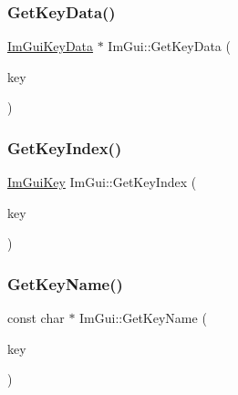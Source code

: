 \mbox{\label{namespaceImGui_aef423d33ae184977d70c75e42bcb0364}} 
\subsubsection{\texorpdfstring{Get\+Key\+Data()}{GetKeyData()}}
{\footnotesize\ttfamily \hyperlink{structImGuiKeyData}{Im\+Gui\+Key\+Data} $\ast$ Im\+Gui\+::\+Get\+Key\+Data (\begin{DoxyParamCaption}\item[{\hyperlink{imgui_8h_aa22ffe36b188427d712447ec465203d4}{Im\+Gui\+Key}}]{key }\end{DoxyParamCaption})}

\mbox{\label{namespaceImGui_a03f5c2b43767af1947c9a9eea38a367d}} 
\subsubsection{\texorpdfstring{Get\+Key\+Index()}{GetKeyIndex()}}
{\footnotesize\ttfamily \hyperlink{imgui_8h_aa22ffe36b188427d712447ec465203d4}{Im\+Gui\+Key} Im\+Gui\+::\+Get\+Key\+Index (\begin{DoxyParamCaption}\item[{\hyperlink{imgui_8h_aa22ffe36b188427d712447ec465203d4}{Im\+Gui\+Key}}]{key }\end{DoxyParamCaption})}

\mbox{\label{namespaceImGui_a1d631e0e344472fb2da1a53a6bf55448}} 
\subsubsection{\texorpdfstring{Get\+Key\+Name()}{GetKeyName()}}
{\footnotesize\ttfamily const char $\ast$ Im\+Gui\+::\+Get\+Key\+Name (\begin{DoxyParamCaption}\item[{\hyperlink{imgui_8h_aa22ffe36b188427d712447ec465203d4}{Im\+Gui\+Key}}]{key }\end{DoxyParamCaption})}

\mbox{\label{namespaceImGui_a48359a9849c1cb2af8fb30c655cf8ff5}} 
